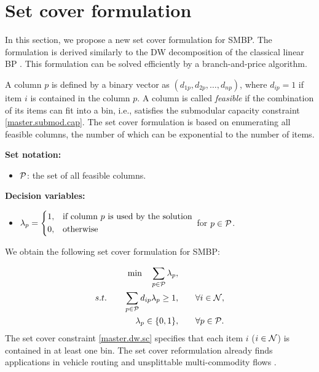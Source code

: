 \section{Set cover formulation}
\label{sec.prob}
In this section, we propose a new set cover formulation for SMBP. The formulation is derived similarly to the DW decomposition of the classical linear BP \citep{delorme2016bin}. This formulation can be solved efficiently by a branch-and-price algorithm.

A column \(p\) is defined by a binary vector as \((d_{1p}, d_{2p}, \hdots,d_{np})\), where \(d_{ip} = 1\) if item \(i\) is contained in the column \(p\). A column is called \textit{feasible} if the combination of its items can fit into a bin, i.e., satisfies the submodular capacity constraint \eqref{master.submod.cap}. The set cover formulation is based on enumerating all feasible columns, the number of which can be exponential to the number of items.

\textbf{Set notation:}

\begin{itemize}
 \item \(\mathcal P\): the set of all feasible columns.
\end{itemize}



\textbf{Decision variables:}
\begin{itemize}
 \item $\lambda_p = \begin{dcases} 1, & \textup{if column \(p\) is used by the solution}\\
  0, & \textup{otherwise}
 \end{dcases}$ for $p \in \mathcal P$.
\end{itemize}



We obtain the following set cover formulation for SMBP:

 \begin{subequations}
 \label{master.dw}
 \begin{align}
 \min \quad \sum_{p \in \mathcal P} \lambda_p, \qquad&\\
 s.t. \qquad \sum_{p \in \mathcal P} d_{ip} \lambda_p \ge 1, \qquad& \forall i \in \mathcal N, \label{master.dw.sc}\\
 \qquad \lambda_p \in \{0,1\}, \qquad & \forall p \in \mathcal P.
 \end{align}
 \end{subequations}
The set cover constraint \eqref{master.dw.sc} specifies that each item \(i\) ($i \in \mathcal N$) is contained in at least one bin. The set cover reformulation already finds applications in vehicle routing \cite{pecin2017improved} and unsplittable multi-commodity flows \cite{xu2022branch}.

